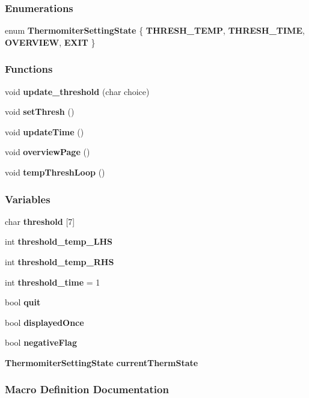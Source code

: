 \subsubsection*{Enumerations}
\begin{DoxyCompactItemize}
\item 
enum \textbf{ Thermomiter\+Setting\+State} \{ \textbf{ T\+H\+R\+E\+S\+H\+\_\+\+T\+E\+MP}, 
\textbf{ T\+H\+R\+E\+S\+H\+\_\+\+T\+I\+ME}, 
\textbf{ O\+V\+E\+R\+V\+I\+EW}, 
\textbf{ E\+X\+IT}
 \}
\end{DoxyCompactItemize}
\subsubsection*{Functions}
\begin{DoxyCompactItemize}
\item 
void \textbf{ update\+\_\+threshold} (char choice)
\item 
void \textbf{ set\+Thresh} ()
\item 
void \textbf{ update\+Time} ()
\item 
void \textbf{ overview\+Page} ()
\item 
void \textbf{ temp\+Thresh\+Loop} ()
\end{DoxyCompactItemize}
\subsubsection*{Variables}
\begin{DoxyCompactItemize}
\item 
char \textbf{ threshold} [7]
\item 
int \textbf{ threshold\+\_\+temp\+\_\+\+L\+HS}
\item 
int \textbf{ threshold\+\_\+temp\+\_\+\+R\+HS}
\item 
int \textbf{ threshold\+\_\+time} = 1
\item 
bool \textbf{ quit}
\item 
bool \textbf{ displayed\+Once}
\item 
bool \textbf{ negative\+Flag}
\item 
\textbf{ Thermomiter\+Setting\+State} \textbf{ current\+Therm\+State}
\end{DoxyCompactItemize}


\subsubsection{Macro Definition Documentation}
\mbox{\label{a00053_aed8ea54a2630aaf2ae3f2bd5fa886959}} 
